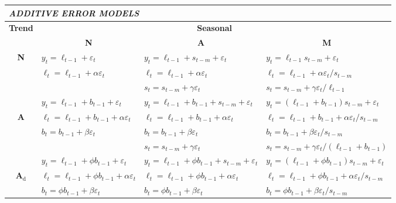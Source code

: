 \documentclass[11pt,a4paper]{article}
\def\damped{_\text{d}}
\begin{document}
\def\dampfactor{\phi_h}
\def\damped{$_{\text{d}}$}

\begin{small}\fontsize{7.9}{10}\rmfamily\tabcolsep=0.1cm
\begin{tabular}{clll}
\multicolumn{4}{l}{\it ADDITIVE ERROR MODELS}\\
\toprule
\bf Trend & \multicolumn{3}{c}{\bf Seasonal} \\
 & \multicolumn{1}{c}{\bf N}
 & \multicolumn{1}{c}{\bf A}
 & \multicolumn{1}{c}{\bf M} \\
\cmidrule{2-4}
{\bf N}
    & $y_{t} = \ell_{t-1}+\varepsilon_t$
    & $y_{t} = \ell_{t-1} + s_{t-m}+\varepsilon_t$
    & $y_{t} = \ell_{t-1} s_{t-m}+\varepsilon_t$ \\
    & $\ell_t = \ell_{t-1} + \alpha  \varepsilon_t$
    & $\ell_t = \ell_{t-1} + \alpha  \varepsilon_t$
    & $\ell_t = \ell_{t-1} + \alpha  \varepsilon_t/s_{t-m}$ \\
    &&$s_t = s_{t-m} + \gamma  \varepsilon_t$
    & $s_t = s_{t-m} + \gamma  \varepsilon_t/\ell_{t-1}$
\\
\midrule
    & $y_{t} = \ell_{t-1} + b_{t-1}+\varepsilon_t$
    & $y_{t} = \ell_{t-1} + b_{t-1} + s_{ t-m}+\varepsilon_t$
    & $y_{t} = (\ell_{t-1}+b_{t-1})s_{t-m}+\varepsilon_t$ \\
{\bf A}
    & $\ell_t = \ell_{t-1} + b_{t-1} + \alpha  \varepsilon_t$
    & $\ell_t = \ell_{t-1} + b_{t-1} + \alpha  \varepsilon_t$
    & $\ell_t = \ell_{t-1} + b_{t-1} + \alpha
    \varepsilon_t/s_{t-m}$ \\
    & $b_t = b_{t-1} + \beta  \varepsilon_t$
    & $b_t = b_{t-1} + \beta  \varepsilon_t$
    & $b_t = b_{t-1} + \beta  \varepsilon_t/s_{t-m}$ \\
    &
    & $s_t =  s_{t-m} + \gamma  \varepsilon_t$
    & $s_t =  s_{t-m} + \gamma  \varepsilon_t/(\ell_{t-1}+b_{t-1})$
\\
\midrule
    & $y_{t} =  \ell_{t-1} + \phi b_{t-1}+\varepsilon_t$
    & $y_{t} =  \ell_{t-1} + \phi b_{t-1} + s_{t-m}+\varepsilon_t$
    & $y_{t} = (\ell_{t-1} + \phi b_{t-1})s_{t-m}+\varepsilon_t$ \\
{\bf A\damped }
    & $\ell_t = \ell_{t-1} + \phi b_{t-1} + \alpha  \varepsilon_t$
    & $\ell_t = \ell_{t-1} + \phi b_{t-1} + \alpha  \varepsilon_t$
    & $\ell_t = \ell_{t-1} + \phi b_{t-1} + \alpha
    \varepsilon_t/s_{t-m}$ \\
    & $b_t = \phi b_{t-1} + \beta  \varepsilon_t$
    & $b_t = \phi b_{t-1} + \beta  \varepsilon_t$
    & $b_t = \phi b_{t-1} + \beta  \varepsilon_t/s_{t-m}$ \\

\end{tabular}
\end{small}
\end{document}
